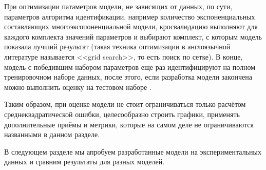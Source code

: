     При оптимизации патаметров модели, не зависящих от данных, по сути, 
    параметров алгоритма идентификации, например количество экспоненциальных 
    составляющих многоэксопоненциальной модели, кросвалидацию выполняют для 
    каждого комплекта значений параметров и выбирают комплект, с которым 
    модель показала лучший результат (такая техника оптимизации в англоязычной 
    литературе называется <<grid search>>, то есть поиск по сетке). В конце,
    модель с победившим набором параметров еще раз идентифицируют на полном
    тренировочном наборе данных, после этого, если разработка модели закончена
    можно выполнить оценку на тестовом наборе \cite{sklearn_cross_validation}.

    Таким образом, при оценке модели не стоит ограничиваться только расчётом
    среднеквадратической ошибки, целесообразно строить графики, применять 
    дополнительные приёмы и метрики, которые на самом деле не ограничиваются
    названными в данном разделе. 

    В следующем разделе мы апробуем разработанные модели на экспериментальных 
    данных и сравним результаты для разных моделей.